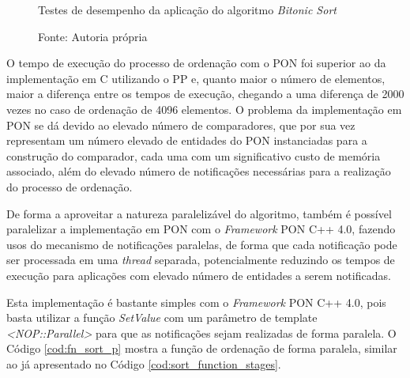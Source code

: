\begin{figure}[!htb]
\centering
{}
\caption{Testes de desempenho da aplicação do algoritmo \textit{Bitonic Sort}}
\caption*{Fonte: Autoria própria}
\label{fig:bitonic_bench}
\end{figure}

O tempo de execução do processo de ordenação com o PON foi superior ao da
implementação em C utilizando o PP e, quanto maior o número de elementos, maior a
diferença entre os tempos de execução, chegando a uma diferença de 2000 vezes no
caso de ordenação de 4096 elementos. O problema da implementação em PON se dá
devido ao elevado número de comparadores, que por sua vez representam um número
elevado de entidades do PON instanciadas para a construção do comparador, cada
uma com um significativo custo de memória associado, além do elevado número de
notificações necessárias para a realização do processo de ordenação. 

De forma a aproveitar a natureza paralelizável do algoritmo, também é possível
paralelizar a implementação em PON com o \textit{Framework} PON C++ 4.0, fazendo
usos do mecanismo de notificações paralelas, de forma que cada notificação pode
ser processada em uma \textit{thread} separada, potencialmente reduzindo os
tempos de execução para aplicações com elevado número de entidades a serem
notificadas.

Esta implementação é bastante simples com o \textit{Framework} PON C++ 4.0, pois
basta utilizar a função \textit{SetValue} com um parâmetro de template
\textit{<NOP::Parallel>} para que as notificações sejam realizadas de forma
paralela. O Código \ref{cod:fn_sort_p} mostra a função de ordenação de forma
paralela, similar ao já apresentado no Código \ref{cod:sort_function_stages}.

